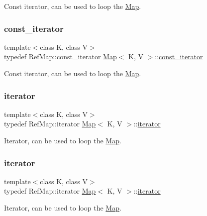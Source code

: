 Const iterator, can be used to loop the \hyperlink{classMap}{Map}. \mbox{\label{classMap_add90fe1e25806ba6f6278b264e78ee9a}} 
\subsubsection{\texorpdfstring{const\+\_\+iterator}{const\_iterator}\hspace{0.1cm}{\footnotesize\ttfamily [2/2]}}
{\footnotesize\ttfamily template$<$class K, class V$>$ \\
typedef Ref\+Map\+::const\+\_\+iterator \hyperlink{classMap}{Map}$<$ K, V $>$\+::\hyperlink{classMap_add90fe1e25806ba6f6278b264e78ee9a}{const\+\_\+iterator}}

Const iterator, can be used to loop the \hyperlink{classMap}{Map}. \mbox{\label{classMap_ad1f372a2028b9f46497e873b0e984e84}} 
\subsubsection{\texorpdfstring{iterator}{iterator}\hspace{0.1cm}{\footnotesize\ttfamily [1/2]}}
{\footnotesize\ttfamily template$<$class K, class V$>$ \\
typedef Ref\+Map\+::iterator \hyperlink{classMap}{Map}$<$ K, V $>$\+::\hyperlink{classMap_ad1f372a2028b9f46497e873b0e984e84}{iterator}}

Iterator, can be used to loop the \hyperlink{classMap}{Map}. \mbox{\label{classMap_ad1f372a2028b9f46497e873b0e984e84}} 
\subsubsection{\texorpdfstring{iterator}{iterator}\hspace{0.1cm}{\footnotesize\ttfamily [2/2]}}
{\footnotesize\ttfamily template$<$class K, class V$>$ \\
typedef Ref\+Map\+::iterator \hyperlink{classMap}{Map}$<$ K, V $>$\+::\hyperlink{classMap_ad1f372a2028b9f46497e873b0e984e84}{iterator}}

Iterator, can be used to loop the \hyperlink{classMap}{Map}. 

